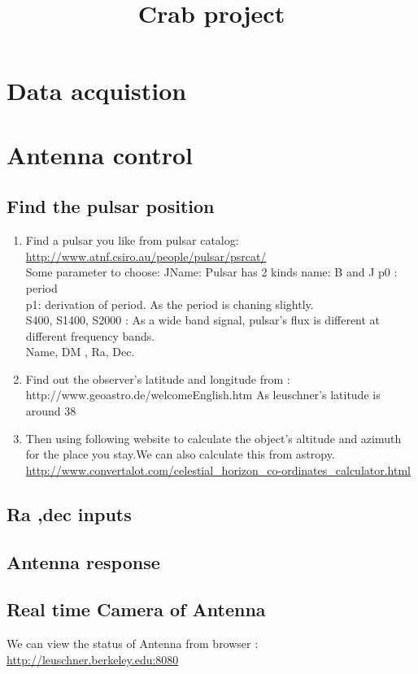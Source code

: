 \documentclass{article}
\title{Crab project}
\begin{document}
\maketitle
\section{Data acquistion}
\section{Antenna control}
\subsection{Find the pulsar position}

\begin{enumerate}[step i]
\item Find a pulsar you like from pulsar catalog:\\
\url{http://www.atnf.csiro.au/people/pulsar/psrcat/}\\
Some parameter to choose:
JName: Pulsar has 2 kinds name: B and J
p0 : period \\
p1: derivation of period. As the period is chaning slightly.\\
S400, S1400, S2000 : As a wide band signal, pulsar’s flux is different at different frequency bands. \\
Name, DM , Ra, Dec.

\item Find out the observer’s latitude and longitude from :
http://www.geoastro.de/welcomeEnglish.htm
As leuschner’s latitude is around 38 
\item Then using following website to calculate the object’s altitude and azimuth for the place you stay.We can also calculate this from astropy.  \\
\url{http://www.convertalot.com/celestial_horizon_co-ordinates_calculator.html}
\end{enumerate}

\subsection{Ra ,dec inputs}
\subsection{Antenna response}
\subsection{Real time Camera of Antenna}
We can view the status of Antenna from browser :\\
\url{http://leuschner.berkeley.edu:8080}
\end{document}
